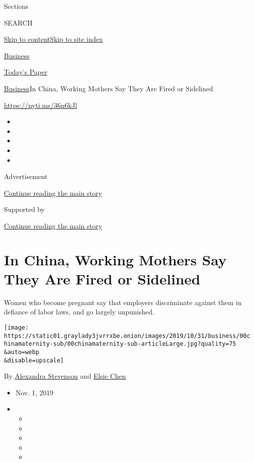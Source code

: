 Sections

SEARCH

\protect\hyperlink{site-content}{Skip to
content}\protect\hyperlink{site-index}{Skip to site index}

\href{https://www.nytimes3xbfgragh.onion/section/business}{Business}

\href{https://myaccount.nytimes3xbfgragh.onion/auth/login?response_type=cookie\&client_id=vi}{}

\href{https://www.nytimes3xbfgragh.onion/section/todayspaper}{Today's
Paper}

\href{/section/business}{Business}\textbar{}In China, Working Mothers
Say They Are Fired or Sidelined

\url{https://nyti.ms/36n6kJl}

\begin{itemize}
\item
\item
\item
\item
\item
\end{itemize}

Advertisement

\protect\hyperlink{after-top}{Continue reading the main story}

Supported by

\protect\hyperlink{after-sponsor}{Continue reading the main story}

\hypertarget{in-china-working-mothers-say-they-are-fired-or-sidelined}{%
\section{In China, Working Mothers Say They Are Fired or
Sidelined}\label{in-china-working-mothers-say-they-are-fired-or-sidelined}}

Women who become pregnant say that employers discriminate against them
in defiance of labor laws, and go largely unpunished.

\texttt{[image: https://static01.graylady3jvrrxbe.onion/images/2019/10/31/business/00chinamaternity-sub/00chinamaternity-sub-articleLarge.jpg?quality=75\\\&auto=webp\\\&disable=upscale]}

By
\href{https://www.nytimes3xbfgragh.onion/by/alexandra-stevenson}{Alexandra
Stevenson} and
\href{https://www.nytimes3xbfgragh.onion/by/elsie-chen}{Elsie Chen}

\begin{itemize}
\item
  Nov. 1, 2019
\item
  \begin{itemize}
  \item
  \item
  \item
  \item
  \item
  \end{itemize}
\end{itemize}

